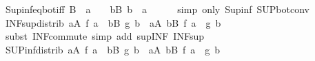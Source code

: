 \begin{isabellebody}
{\isafoldproof}%
%
\isadelimproof
\isanewline
%
\endisadelimproof
\isanewline
{}\isamarkupfalse%
\ Sup{\isacharunderscore}{\kern0pt}inf{\isacharunderscore}{\kern0pt}eq{\isacharunderscore}{\kern0pt}bot{\isacharunderscore}{\kern0pt}iff{\isacharcolon}{\kern0pt}\ {\isachardoublequoteopen}{\isacharparenleft}{\kern0pt}{\isasymSqunion}B\ {\isasymsqinter}\ a\ {\isacharequal}{\kern0pt}\ {\isasymbottom}{\isacharparenright}{\kern0pt}\ {\isasymlongleftrightarrow}\ {\isacharparenleft}{\kern0pt}{\isasymforall}b{\isasymin}B{\isachardot}{\kern0pt}\ b\ {\isasymsqinter}\ a\ {\isacharequal}{\kern0pt}\ {\isasymbottom}{\isacharparenright}{\kern0pt}{\isachardoublequoteclose}\isanewline
%
\isadelimproof
\ \ %
\endisadelimproof
%
\isatagproof
{}\isamarkupfalse%
\ {\isacharparenleft}{\kern0pt}simp\ only{\isacharcolon}{\kern0pt}\ Sup{\isacharunderscore}{\kern0pt}inf\ SUP{\isacharunderscore}{\kern0pt}bot{\isacharunderscore}{\kern0pt}conv{\isacharparenright}{\kern0pt}%
\endisatagproof
{\isafoldproof}%
%
\isadelimproof
\isanewline
%
\endisadelimproof
\isanewline
{}\isamarkupfalse%
\ INF{\isacharunderscore}{\kern0pt}sup{\isacharunderscore}{\kern0pt}distrib{}{\isacharcolon}{\kern0pt}\ {\isachardoublequoteopen}{\isacharparenleft}{\kern0pt}{\isasymSqinter}a{\isasymin}A{\isachardot}{\kern0pt}\ f\ a{\isacharparenright}{\kern0pt}\ {\isasymsqunion}\ {\isacharparenleft}{\kern0pt}{\isasymSqinter}b{\isasymin}B{\isachardot}{\kern0pt}\ g\ b{\isacharparenright}{\kern0pt}\ {\isacharequal}{\kern0pt}\ {\isacharparenleft}{\kern0pt}{\isasymSqinter}a{\isasymin}A{\isachardot}{\kern0pt}\ {\isasymSqinter}b{\isasymin}B{\isachardot}{\kern0pt}\ f\ a\ {\isasymsqunion}\ g\ b{\isacharparenright}{\kern0pt}{\isachardoublequoteclose}\isanewline
%
\isadelimproof
\ \ %
\endisadelimproof
%
\isatagproof
{}\isamarkupfalse%
\ {\isacharparenleft}{\kern0pt}subst\ INF{\isacharunderscore}{\kern0pt}commute{\isacharparenright}{\kern0pt}\ {\isacharparenleft}{\kern0pt}simp\ add{\isacharcolon}{\kern0pt}\ sup{\isacharunderscore}{\kern0pt}INF\ INF{\isacharunderscore}{\kern0pt}sup{\isacharparenright}{\kern0pt}%
\endisatagproof
{\isafoldproof}%
%
\isadelimproof
\isanewline
%
\endisadelimproof
\isanewline
{}\isamarkupfalse%
\ SUP{\isacharunderscore}{\kern0pt}inf{\isacharunderscore}{\kern0pt}distrib{}{\isacharcolon}{\kern0pt}\ {\isachardoublequoteopen}{\isacharparenleft}{\kern0pt}{\isasymSqunion}a{\isasymin}A{\isachardot}{\kern0pt}\ f\ a{\isacharparenright}{\kern0pt}\ {\isasymsqinter}\ {\isacharparenleft}{\kern0pt}{\isasymSqunion}b{\isasymin}B{\isachardot}{\kern0pt}\ g\ b{\isacharparenright}{\kern0pt}\ {\isacharequal}{\kern0pt}\ {\isacharparenleft}{\kern0pt}{\isasymSqunion}a{\isasymin}A{\isachardot}{\kern0pt}\ {\isasymSqunion}b{\isasymin}B{\isachardot}{\kern0pt}\ f\ a\ {\isasymsqinter}\ g\ b{\isacharparenright}{\kern0pt}{\isachardoublequoteclose}\isanewline

\end{isabellebody}
